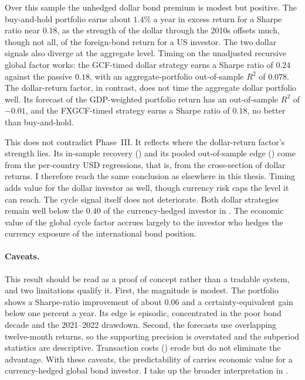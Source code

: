 \begin{table}[t]
  \caption{The US-dollar investor: timing dollar returns with the dollar-return factor}
  \label{tab:strat-usd}
  \centering
  
\end{table}

Over this sample the
unhedged dollar bond premium is modest but positive. The buy-and-hold portfolio
earns about $1.4\%$ a year in excess return for a Sharpe ratio near $0.18$, as
the strength of the dollar through the 2010s offsets much, though not all, of
the foreign-bond return for a US investor. The two dollar signals also
diverge at the aggregate level. Timing on the unadjusted recursive global
factor works: the GCF-timed dollar strategy earns a Sharpe ratio of $0.24$
against the passive $0.18$, with an aggregate-portfolio out-of-sample $R^{2}$
of $0.078$. The dollar-return factor, in contrast, does not time the
aggregate dollar portfolio well. Its forecast of the GDP-weighted
portfolio return has an out-of-sample $R^{2}$ of $-0.01$, and the FXGCF-timed
strategy earns a Sharpe ratio of $0.18$, no better than buy-and-hold.

This does not contradict Phase~III. It reflects where the
dollar-return factor's strength lies. Its in-sample recovery
() and its pooled out-of-sample edge
() come from the per-country USD regressions, that is,
from the cross-section of dollar returns. I therefore reach the same conclusion
as elsewhere in this thesis. Timing adds value for the dollar investor
as well, though currency risk caps the
level it can reach. The cycle signal itself does not deteriorate. Both dollar strategies remain well below the $0.40$ of
the currency-hedged investor in . The economic
value of the global cycle factor accrues largely to the investor who
hedges the currency exposure of the international bond position.

\paragraph{Caveats.}
\label{sec:strat-caveats}
This result should be read as a proof of concept rather than a tradable system, and
two limitations qualify it. First, the magnitude is modest. The portfolio shows a
Sharpe-ratio improvement of about $0.06$ and a certainty-equivalent gain below
one percent a year. Its edge is episodic, concentrated in the poor bond decade
and the 2021--2022 drawdown. Second, the
forecasts use overlapping twelve-month returns, so the supporting precision is
overstated and the subperiod statistics are descriptive. Transaction costs
() erode but do not eliminate the advantage. With these caveats, the predictability of  carries economic value for a currency-hedged global bond investor. I take up the broader interpretation in .
